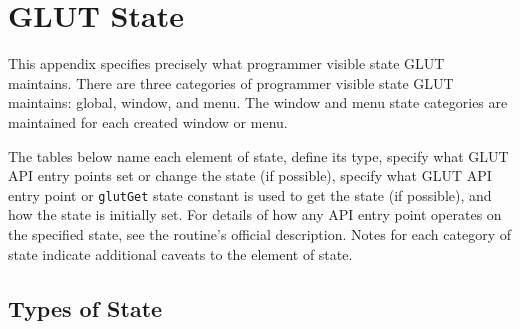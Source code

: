 \newpage

\appendix


\section{GLUT State}

This appendix specifies precisely what programmer visible state GLUT
maintains.  There are three categories of programmer visible state GLUT
maintains:  global, window, and menu.  The window and menu state categories
are maintained for each created window or menu.

The tables below name each element of state, define its type, specify
what GLUT API entry points set or change the state (if possible), specify what GLUT API
entry point or {\tt glutGet} state constant is used to get the state (if possible),
and how the state is initially set.  For details of how any API entry point
operates on the specified state, see the routine's official description.
Notes for each category of state indicate additional caveats to the element
of state.

\subsection{Types of State}

